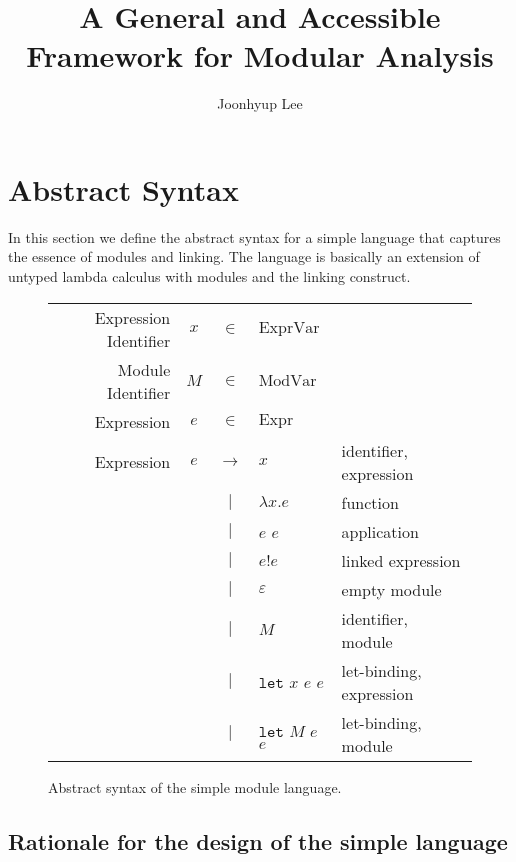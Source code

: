 \documentclass[acmsmall,screen,review]{acmart}
\title{A General and Accessible Framework for Modular Analysis}
\author{Joonhyup Lee}
\theoremstyle{definition}
\newcommand*{\vbar}{|}
\newcommand*{\Expr}{\text{Expr}}
\newcommand*{\ExprVar}{\text{ExprVar}}
\newcommand*{\ModVar}{\text{ModVar}}
\newcommand*{\link}[2]{{#1}\mathtt{!}{#2}}
\newcommand*{\Let}{\mathtt{let}}
\begin{document}
\maketitle

\section{Abstract Syntax}

In this section we define the abstract syntax for a simple language that captures the essence of modules and linking.
The language is basically an extension of untyped lambda calculus with modules and the linking construct.

\begin{figure}[htb]
  \centering
  \footnotesize
  \begin{tabular}{rccll}
    Expression Identifier & $x$ & $\in$         & $\ExprVar$                                   \\
    Module Identifier     & $M$ & $\in$         & $\ModVar$                                    \\
    Expression            & $e$ & $\in$         & $\Expr$                                      \\
    Expression            & $e$ & $\rightarrow$ & $x$                & identifier, expression  \\
                          &     & $\vbar$       & $\lambda x.e$      & function                \\
                          &     & $\vbar$       & $e$ $e$            & application             \\
                          &     & $\vbar$       & $\link{e}{e}$      & linked expression       \\
                          &     & $\vbar$       & $\varepsilon$      & empty module            \\
                          &     & $\vbar$       & $M$                & identifier, module      \\
                          &     & $\vbar$       & $\Let$ $x$ $e$ $e$ & let-binding, expression \\
                          &     & $\vbar$       & $\Let$ $M$ $e$ $e$ & let-binding, module     \\
  \end{tabular}
  \caption{Abstract syntax of the simple module language.}
\end{figure}
\subsection{Rationale for the design of the simple language}
\end{document}
